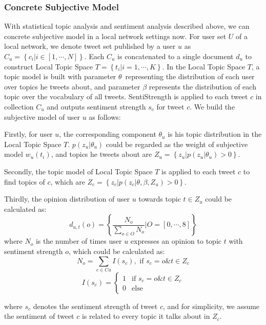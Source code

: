 \documentclass{acm_proc_article-sp}
\begin{document}
\subsubsection{Concrete Subjective Model}
\label{concrete}
With statistical topic analysis and sentiment analysis described above, we can concrete subjective model in a local network settings now. 
For user set $ U $ of a local network, we denote tweet set published by a user $ u $ as $ C_{u}=\left\lbrace c_{i} \vert i \in \left[ 1, \cdots, N \right]  \right\rbrace$. Each $ C_{u} $ is concatenated to a single document $ d_{u} $ to construct Local Topic Space $ T=\left\lbrace t_{i} \vert i=1, \cdots, K \right\rbrace $.
In the Local Topic Space $ T $, a topic model is built with parameter $ \theta $\ representing the distribution of each user over topics he tweets about, and
parameter $ \beta $ represents the distribution of each topic over the vocabulary of all tweets. SentiStrength is applied to each tweet $ c $ in collection $ C_{u} $ and outputs sentiment strength $ s_{c} $ for tweet $ c $. 
We build the subjective model of user $ u $ as follows:
\begin{itemize*}
\item Firstly, for user $ u $, the corresponding component $ \theta_{u} $ is his topic distribution in the Local Topic Space $ T $. $ p\left( z_{u} \vert \theta_{u} \right)  $ could be regarded as the weight of subjective model $ w_{u} \left( t_{i} \right)  $, and topics he tweets about are $ Z_{u}= \left\lbrace z_{u} \vert p\left( z_{u} \vert \theta_{u} \right)>0 \right\rbrace $.
\item Secondly, the topic model of Local Topic Space $ T $ is applied to each tweet $ c $ to find topics of $ c $, which are $ Z_{c} =\left\lbrace z_{c} \vert p\left( z_{c} \vert \theta, \beta, Z_{u} \right)>0 \right\rbrace $.
\item Thirdly, the opinion distribution of user $ u $ towards topic $ t \in Z_{u} $ could be calculated as:
\begin{equation}
\label{opinionall}
d_{u,t}\left( o \right) = \left\lbrace \dfrac{N_{o}}{\sum_{o \in O} N_{o}} \vert O=\left[ 0, \cdots, 8 \right] \right\rbrace 
\end{equation}
where $ N_{o} $ is the number of times user $ u $ expresses an opinion to topic $ t $ with sentiment strength $ o $, which could be calculated as:
\begin{equation}
\label{opinion1}
N_{o}=\sum_{c \in Cu} I\left( s_{c} \right) , \text{ if } s_{c}=o \& t \in Z_{c}
\end{equation}
\begin{equation}
\label{opinion2}
I\left( s_{c} \right)=\left\{
\begin{array}{ll}
{1} & \text{if } s_{c}=o \& t \in Z_{c}\\
{0} & \text{else}
\end{array}
\right.
\end{equation}

where $ s_{c} $ denotes the sentiment strength of tweet $ c $, and for simplicity, we assume the sentiment of tweet $ c $ is related to every topic it talks about in $ Z_{c} $.

\end{itemize*}
\end{document}
